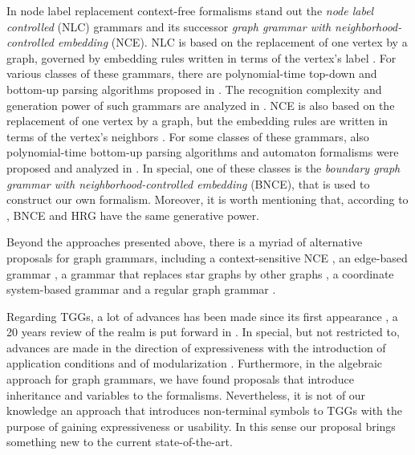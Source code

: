 \documentclass[]{report}
\begin{document}
In node label replacement context-free formalisms stand out the \textit{node label controlled} (NLC) grammars and its successor \textit{graph grammar with neighborhood-controlled embedding} (NCE). NLC is based on the replacement of one vertex by a graph, governed by embedding rules written in terms of the vertex's label \cite{rozenberg1986boundary}. For various classes of these grammars, there are polynomial-time top-down and bottom-up parsing algorithms proposed in \cite{flasinski1993parsing,flasinski2014characteristics, rozenberg1986boundary, wanke1991algorithms}. The recognition complexity and generation power of such grammars are analyzed in \cite{flasinski1998power,kim2012structure}. NCE is also based on the replacement of one vertex by a graph, but the embedding rules are written in terms of the vertex's neighbors \cite{janssens1982graph,skodinis1998neighborhood}. For some classes of these grammars, also polynomial-time bottom-up parsing algorithms and automaton formalisms were proposed and analyzed in \cite{kim2001efficient,brandenburg2005finite}. In special, one of these classes is the \textit{boundary graph grammar with neighborhood-controlled embedding} (BNCE), that is used to construct our own formalism. Moreover, it is worth mentioning that, according to \cite{engelfiet1990comparison}, BNCE and HRG have the same generative power.

Beyond the approaches presented above, there is a myriad of alternative proposals for graph grammars, including a context-sensitive NCE \cite{adachi1999nce}, an edge-based grammar \cite{shi2015method}, a grammar that replaces star graphs by other graphs \cite{drewes2010adaptive}, a coordinate system-based grammar \cite{kong2006spatial} and a regular graph grammar \cite{gilroy2017parsing}.

Regarding TGGs, a lot of advances has been made since its first appearance \cite{schurr1994specification}, a 20 years review of the realm is put forward in \cite{anjorin201620}. In special, but not restricted to, advances are made in the direction of expressiveness with the introduction of application conditions \cite{klar2010extended} and of modularization \cite{anjorin2014modularizing}. Furthermore, in the algebraic approach for graph grammars, we have found proposals that introduce inheritance \cite{bardohl2004integrating,hermann2008typed} and variables \cite{hoffmann2005graph} to the formalisms. Nevertheless, it is not of our knowledge an approach that introduces non-terminal symbols to TGGs with the purpose of gaining expressiveness or usability. In this sense our proposal brings something new to the current state-of-the-art.
\end{document}
